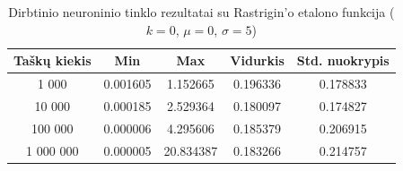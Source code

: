 \begin{table}[H]
    \centering
    \begin{tabular}{|c|c|c|c|c|}
        \hline
        \textbf{Taškų kiekis} & \textbf{Min} & \textbf{Max} & \textbf{Vidurkis} & \textbf{Std. nuokrypis} \\ \hline
        1 000        & 0.001605 & 1.152665 & 0.196336 & 0.178833 \\ \hline
        10 000       & 0.000185 & 2.529364 & 0.180097 & 0.174827 \\ \hline
        100 000      & 0.000006 & 4.295606 & 0.185379 & 0.206915 \\ \hline
        1 000 000    & 0.000005 & 20.834387 & 0.183266 & 0.214757 \\ \hline
    \end{tabular}
    \caption{Dirbtinio neuroninio tinklo rezultatai su Rastrigin'o etalono funkcija ($k = 0$, $\mu = 0$, $\sigma = 5$)}
\end{table}